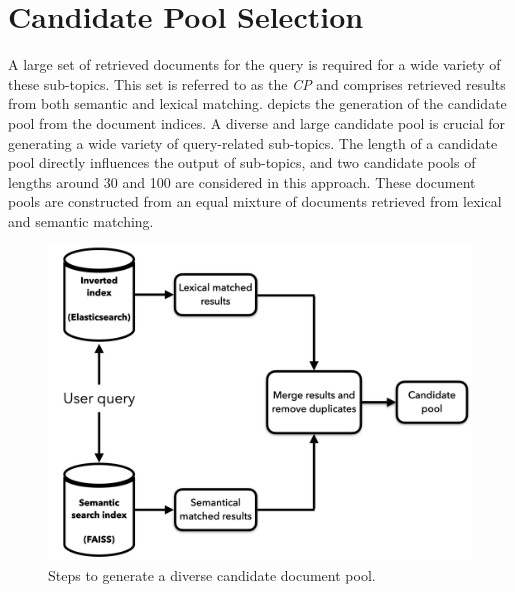 \section{Candidate Pool Selection}


A large set of retrieved documents for the query is required for a wide variety of these sub-topics. This set is referred to as the \emph{\ac{CP}} and comprises retrieved results from both semantic and lexical matching.  depicts the generation of the candidate pool from the document indices. A diverse and large candidate pool is crucial for generating a wide variety of query-related sub-topics. The length of a candidate pool directly influences the output of sub-topics, and two candidate pools of lengths around 30 and 100 are considered in this approach. These document pools are constructed from an equal mixture of documents retrieved from lexical and semantic matching.


\begin{figure}[h]
	\centering
	\includegraphics[width=.8\textwidth]{images/thesis_images/candidate_pool.png}
	\caption{Steps to generate a diverse candidate document pool.  \label{fig:candidate_pool}}
\end{figure}


